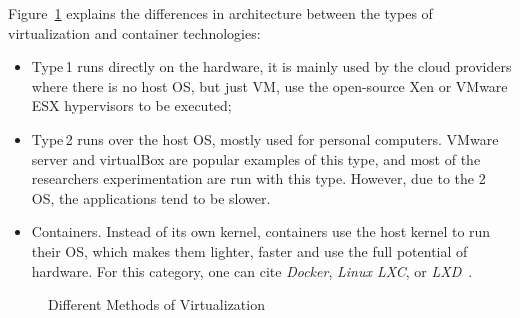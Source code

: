 Figure~\ref{environement:virtualization_technique} explains the differences in architecture between the types of virtualization and container technologies:
\begin{itemize}
    \item \textsf{Type\,1} runs directly on the hardware, it is mainly used by the cloud providers where there is no host OS, but just VM, use the open-source Xen or VMware ESX hypervisors to be executed;
    \item \textsf{Type\,2} runs over the host OS, mostly used for personal computers.
    VMware server and virtualBox are popular examples of this type, and most of the researchers experimentation are run with this type. However, due to the 2 OS, the applications tend to be slower.
    \item \textsf{Containers}. Instead of its own kernel, containers use the host kernel to run their OS, which makes them lighter, faster and use the full potential of hardware.
    For this category, one can cite \emph{Docker}, \emph{Linux LXC}, or \emph{LXD}~\cite{abuabdo_virtualization_2019}.
\end{itemize}

\begin{figure}
    \caption{Different Methods of Virtualization}\label{environement:virtualization_technique}
\end{figure}


